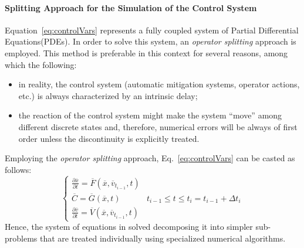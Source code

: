 \paragraph{ Splitting Approach for the Simulation of the Control System}
Equation~\ref{eq:controlVars} represents a fully coupled system of Partial Differential 
Equations(PDEs). In order to solve this system, an  \textit{operator splitting} approach 
is employed. This method is preferable in this context for several reasons, among which the following:
\begin{itemize}
  \item in reality, the control system (automatic mitigation systems, operator actions, 
  etc.) is always characterized by an intrinsic delay;
  \item the reaction of the control system might make the system ``move'' among 
  different discrete states and, therefore, numerical errors will be always of first order
  unless the discontinuity is explicitly treated.
\end{itemize}
Employing the \textit{operator splitting} approach, Eq.~\ref{eq:controlVars}  can be 
casted as follows: 
\begin{equation}
\label{eq:operatorSplitting}
\left\{\begin{matrix}
\frac{\partial \overline{x} }{\partial t} = \overline{F}\left (  \overline{x},\overline{v}_{t_{i-1}}, t \right )  & \\ 
\overline{C} =  \overline{G}(\overline{x},t)  & t_{i-1} \leq t \leq  t_{i} =  t_{i-1} + \Delta  t_{i}\\ 
\frac{\partial \overline{v} }{\partial t} = \overline{V}\left (  \overline{x}, \overline{v}_{t_{i-1}}, t \right ) & 
\end{matrix}\right.
\end{equation}
Hence, the system of equations in solved decomposing it into simpler sub-problems that are treated individually 
using specialized numerical algorithms.

